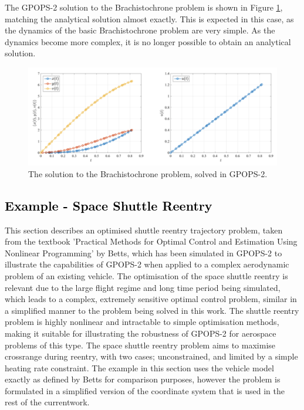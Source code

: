 The GPOPS-2 solution to the Brachistochrone problem is shown in Figure \ref{fig:Brachistochrone}, matching the analytical solution almost exactly. This is expected in this case, as the dynamics of the basic Brachistochrone problem are very simple. As the dynamics become more complex, it is no longer possible to obtain an analytical solution.  

\begin{figure}[ht]
	\centering
	\includegraphics[width=0.9\linewidth]{figures/4_LODESTAR/Brachistochrone}
	\caption{The solution to the Brachistochrone problem, solved in GPOPS-2\cite{Rao2010}.}
	\label{fig:Brachistochrone}
\end{figure}




\textcolor{black}{\section{Example - Space Shuttle Reentry}}
\noindent
This section describes an optimised shuttle reentry trajectory problem, taken from the textbook 'Practical Methods for Optimal Control and Estimation Using Nonlinear Programming' by Betts\cite{Betts2009}, which has been simulated in GPOPS-2 to illustrate the capabilities of GPOPS-2 when applied to a complex aerodynamic problem of an existing vehicle. The optimisation of the space shuttle reentry is relevant due to the large flight regime and long time period being simulated, which leads to a complex, extremely sensitive optimal control problem\cite{Betts2009}, similar in a simplified manner to the problem being solved in this work. The shuttle reentry problem is highly nonlinear and intractable to simple optimisation methods\cite{Betts2009}, making it suitable for illustrating the robustness of GPOPS-2 for aerospace problems of this type. 
The space shuttle reentry problem aims to maximise crossrange during reentry, with two cases; unconstrained, and limited by a simple heating rate constraint. The example in this section uses the vehicle model exactly as defined by Betts\cite{Betts2009} for comparison purposes, however the problem is formulated in a simplified version of the coordinate system that is used in the rest of the currentwork. 


